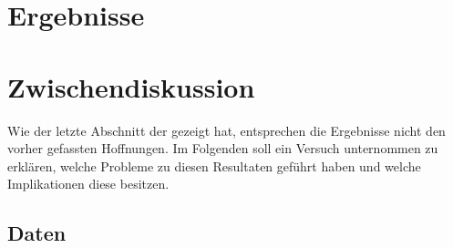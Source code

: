 \section{Ergebnisse}

\section{Zwischendiskussion}

Wie der letzte Abschnitt der gezeigt hat, entsprechen die Ergebnisse nicht den vorher gefassten Hoffnungen.
Im Folgenden soll ein Versuch unternommen zu erklären, welche Probleme zu diesen Resultaten geführt haben und welche
Implikationen diese besitzen.

\subsection{Daten}

